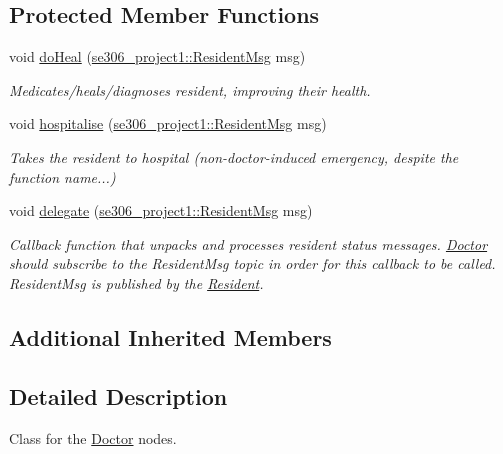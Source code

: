 \subsection*{Protected Member Functions}
\begin{DoxyCompactItemize}
\item 
void \hyperlink{classDoctor_a94076614a0cb51509d1d9158fad36e89}{do\-Heal} (\hyperlink{structse306__project1_1_1ResidentMsg__}{se306\-\_\-project1\-::\-Resident\-Msg} msg)
\begin{DoxyCompactList}\small\item\em Medicates/heals/diagnoses resident, improving their health. \end{DoxyCompactList}\item 
void \hyperlink{classDoctor_afaaaa3914c3a2fe3bbb93f7969afd3d5}{hospitalise} (\hyperlink{structse306__project1_1_1ResidentMsg__}{se306\-\_\-project1\-::\-Resident\-Msg} msg)
\begin{DoxyCompactList}\small\item\em Takes the resident to hospital (non-\/doctor-\/induced emergency, despite the function name...) \end{DoxyCompactList}\item 
void \hyperlink{classDoctor_a004e19945fe023c4b336ca505eed019e}{delegate} (\hyperlink{structse306__project1_1_1ResidentMsg__}{se306\-\_\-project1\-::\-Resident\-Msg} msg)
\begin{DoxyCompactList}\small\item\em Callback function that unpacks and processes resident status messages. \hyperlink{classDoctor}{Doctor} should subscribe to the Resident\-Msg topic in order for this callback to be called. Resident\-Msg is published by the \hyperlink{classResident}{Resident}. \end{DoxyCompactList}\end{DoxyCompactItemize}
\subsection*{Additional Inherited Members}


\subsection{Detailed Description}
Class for the \hyperlink{classDoctor}{Doctor} nodes. 

